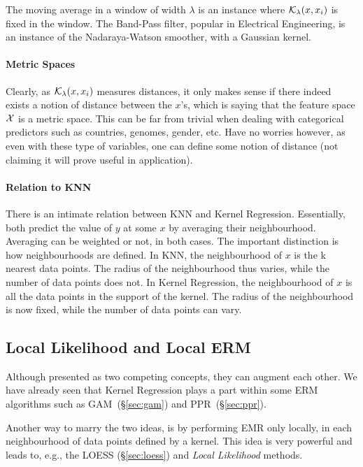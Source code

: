 The moving average in a window of width $\lambda$ is an instance where $\mathcal{K}_\lambda(x,x_i)$ is fixed in the window.
The Band-Pass filter, popular in Electrical Engineering, is an instance of the Nadaraya-Watson smoother, with a Gaussian kernel. %


\paragraph{Metric Spaces}
Clearly, as $\mathcal{K}_\lambda(x,x_i)$ measures distances, it only makes sense if there indeed exists a notion of distance between the $x$'s, which is saying that the feature space $\mathcal{X}$ is a metric space. 
This can be far from trivial when dealing with categorical predictors such as countries, genomes, gender, etc.
Have no worries however, as even with these type of variables, one can define some notion of distance (not claiming it will prove useful in application).


\paragraph{Relation to KNN}
There is an intimate relation between KNN and Kernel Regression. 
Essentially, both predict the value of $y$ at some $x$ by averaging their neighbourhood. 
Averaging can be weighted or not, in both cases.
The important distinction is how neighbourhoods are defined.
In KNN, the neighbourhood of $x$ is the k nearest data points. The radius of the neighbourhood thus varies, while the number of data points does not.
In Kernel Regression, the neighbourhood of $x$ is all the data points in the support of the kernel. The radius of the neighbourhood is now fixed, while the number of data points can vary.




\subsection{Local Likelihood and Local ERM}
Although presented as two competing concepts, they can augment each other. 
We have already seen that Kernel Regression plays a part within some ERM algorithms such as GAM~(\S\ref{sec:gam}) and PPR~(\S \ref{sec:ppr}).

Another way to marry the two ideas, is by performing EMR only locally, in each neighbourhood of data points defined by a kernel. This idea is very powerful and leads to, e.g., the LOESS (\S \ref{sec:loess}) and \emph{Local Likelihood} methods.



